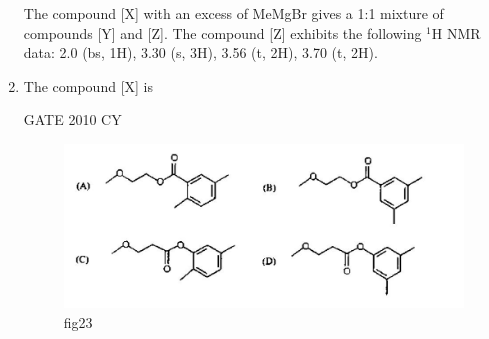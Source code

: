 \documentclass[journal,12pt,onecolumn]{IEEEtran}
\theoremstyle{remark}
\begin{document}
\begin{enumerate}
The compound [X] with an excess of MeMgBr gives a 1:1 mixture of compounds [Y] and [Z]. The compound [Z] exhibits the following $^1$H NMR data: 2.0 (bs, 1H), 3.30 (s, 3H), 3.56 (t, 2H), 3.70 (t, 2H).

\item The compound [X] is

\hfill{GATE 2010 CY}

\begin{figure}[H]
    \centering
    \includegraphics[width=0.75\linewidth]{figs/Q.50.png}
    \caption{fig23}
    \label{fig:figs/Q.50.png}
\end{figure}


\end{enumerate}
\end{document}
